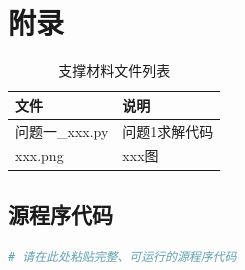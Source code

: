
\makeatletter
\let\@oldaddcontentsline\addcontentsline
\renewcommand{\addcontentsline}[3]{}
\section*{附录}
\let\addcontentsline\@oldaddcontentsline
\makeatother

\begin{table}[H]
  \centering
  \caption{支撑材料文件列表}
  \label{tab:appendix}
  \renewcommand{\arraystretch}{1.2}
  \begin{tabularx}{\textwidth}{LX}
    \toprule
    文件 & 说明 \\
    \midrule
    问题一\_xxx.py & 问题1求解代码 \\
    xxx.png & xxx图 \\
    \bottomrule
  \end{tabularx}
\end{table}

\subsection*{源程序代码}

\begin{lstlisting}[language=Python]
# 请在此处粘贴完整、可运行的源程序代码
\end{lstlisting}
